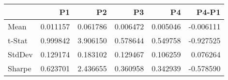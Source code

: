 \begin{tabular}{lrrrrr}
\toprule
 & P1 & P2 & P3 & P4 & P4-P1 \\
\midrule
Mean & 0.011157 & 0.061786 & 0.006472 & 0.005046 & -0.006111 \\
t-Stat & 0.999842 & 3.906150 & 0.578644 & 0.549758 & -0.927525 \\
StdDev & 0.129174 & 0.183102 & 0.129467 & 0.106259 & 0.076264 \\
Sharpe & 0.623701 & 2.436655 & 0.360958 & 0.342939 & -0.578590 \\
\bottomrule
\end{tabular}

